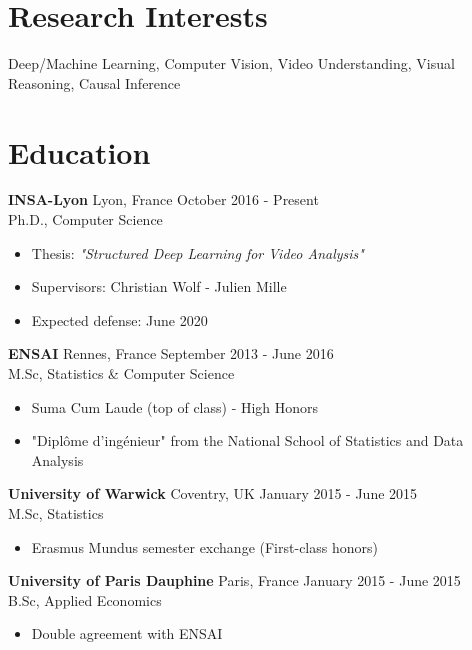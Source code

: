 \documentclass[10pt]{res} %
\begin{document}
\begin{resume}

 
\section{\large Research Interests}  
Deep/Machine Learning, Computer Vision, Video Understanding, Visual Reasoning, Causal Inference


\section{\large Education}
\textbf{INSA-Lyon} \hfill Lyon, France \hfill October 2016 - Present \\
Ph.D., Computer Science
\begin{itemize}
\item  Thesis: {\sl "Structured Deep Learning for Video Analysis"}
\item  Supervisors: Christian Wolf - Julien Mille
\item  Expected defense: June 2020
\end{itemize}


\textbf{ENSAI} \hfill Rennes, France \hfill September 2013 - June 2016 \\
M.Sc, Statistics \& Computer Science
\begin{itemize}
\item Suma Cum Laude (top of class) - High Honors
\item "Diplôme d'ingénieur" from the National School of Statistics and Data Analysis
\end{itemize}

\textbf{University of Warwick} \hfill Coventry, UK \hfill January 2015 - June 2015 \\
M.Sc, Statistics
\begin{itemize}
\item Erasmus Mundus semester exchange (First-class honors)
\end{itemize}

\textbf{University of Paris Dauphine} \hfill Paris, France \hfill January 2015 - June 2015 \\
B.Sc, Applied Economics
\begin{itemize}
\item Double agreement with ENSAI
\end{itemize}


\end{resume}
\end{document}

